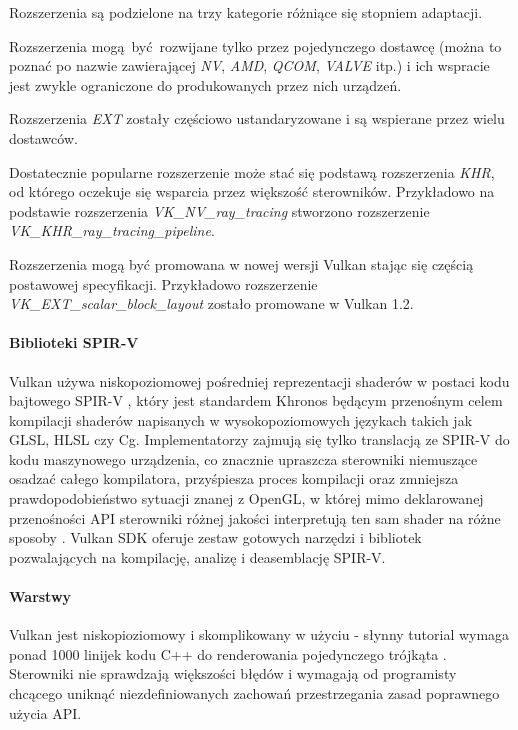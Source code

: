Rozszerzenia są podzielone na trzy kategorie różniące się stopniem adaptacji.

Rozszerzenia mogą być rozwijane tylko przez pojedynczego dostawcę (można to poznać po nazwie zawierającej \textit{NV}, \textit{AMD}, \textit{QCOM}, \textit{VALVE} itp.) i ich wspracie jest zwykle ograniczone do produkowanych przez nich urządzeń.

Rozszerzenia \textit{EXT} zostały częściowo ustandaryzowane i są wspierane przez wielu dostawców.

Dostatecznie popularne rozszerzenie może stać się podstawą rozszerzenia \textit{KHR}, od którego oczekuje się wsparcia przez większość sterowników.
Przykładowo na podstawie rozszerzenia \textit{VK\_NV\_ray\_tracing} stworzono rozszerzenie \textit{VK\_KHR\_ray\_tracing\_pipeline}.

Rozszerzenia mogą być promowana w nowej wersji Vulkan stając się częścią postawowej specyfikacji.
Przykładowo rozszerzenie \textit{VK\_EXT\_scalar\_block\_layout} zostało promowane w Vulkan 1.2.

\paragraph{Biblioteki SPIR-V}

Vulkan używa niskopoziomowej pośredniej reprezentacji shaderów w postaci kodu bajtowego SPIR-V \cite{SPIRVSPEC}, który jest standardem Khronos będącym przenośnym celem kompilacji shaderów napisanych w wysokopoziomowych językach takich jak GLSL, HLSL czy Cg.
Implementatorzy zajmują się tylko translacją ze SPIR-V do kodu maszynowego urządzenia, co znacznie upraszcza sterowniki niemuszące osadzać całego kompilatora, przyśpiesza proces kompilacji oraz zmniejsza prawdopodobieństwo sytuacji znanej z OpenGL, w której mimo deklarowanej przenośności API sterowniki różnej jakości interpretują ten sam shader na różne sposoby \cite{GLSLBAD}.
Vulkan SDK oferuje zestaw gotowych narzędzi i bibliotek pozwalających na kompilację, analizę i deasemblację SPIR-V.

\paragraph{Warstwy}

Vulkan jest niskopioziomowy i skomplikowany w użyciu - słynny tutorial wymaga ponad 1000 linijek kodu C++ do renderowania pojedynczego trójkąta  \cite{VULKANTUTORIAL}.
Sterowniki nie sprawdzają większości błędów i wymagają od programisty chcącego uniknąć niezdefiniowanych zachowań przestrzegania zasad poprawnego użycia API.

